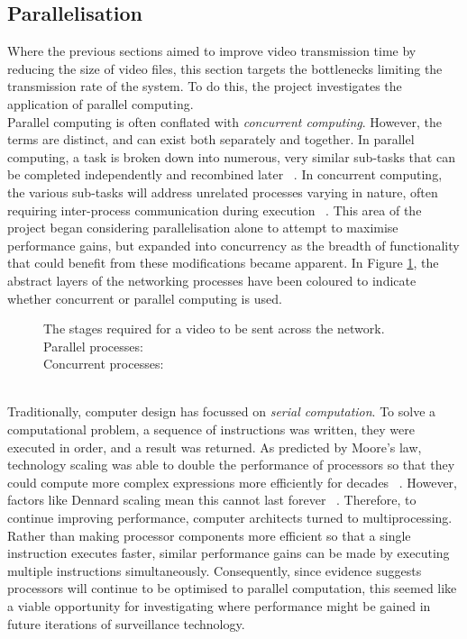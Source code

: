 \subsection{Parallelisation}
\label{sec:parallelisation}
\setlength{\leftskip}{0.5cm}
\indent \indent
Where the previous sections aimed to improve video transmission time by reducing the size of video files, this section targets the bottlenecks limiting the transmission rate of the system. To do this, the project investigates the application of parallel computing.
\smallskip \\ \indent
Parallel computing is often conflated with \textit{concurrent computing}. However, the terms are distinct, and can exist both separately and together. In parallel computing, a task is broken down into numerous, very similar sub-tasks that can be completed independently and recombined later ~\cite{ParallelismVsConcurrency}. In concurrent computing, the various sub-tasks will address unrelated processes varying in nature, often requiring inter-process communication during execution ~\cite{ParallelismVsConcurrency}. This area of the project began considering parallelisation alone to attempt to maximise performance gains, but expanded into concurrency as the breadth of functionality that could benefit from these modifications became apparent. In Figure \ref{fig:parallelStack}, the abstract layers of the networking processes have been coloured to indicate whether concurrent or parallel computing is used.
\begin{figure}[htp]
    \centering
    \scalebox{0.6}{}
    \captionsetup{justification=centering}
    \caption[Abstract view of parallel processes]{The stages required for a video to be sent across the network.\medskip\\Parallel processes: \hl{\quad\quad\quad\quad}\smallskip\\Concurrent processes: \hl{\quad\quad\quad\quad}}
    \label{fig:parallelStack}
\end{figure}
\smallskip \\ \indent
Traditionally, computer design has focussed on \textit{serial computation}. To solve a computational problem, a sequence of instructions was written, they were executed in order, and a result was returned. As predicted by Moore's law, technology scaling was able to double the performance of processors so that they could compute more complex expressions more efficiently for decades ~\cite{Moore}. However, factors like Dennard scaling mean this cannot last forever ~\cite{Dennard}. Therefore, to continue improving performance, computer architects turned to multiprocessing. Rather than making processor components more efficient so that a single instruction executes faster, similar performance gains can be made by executing multiple instructions simultaneously. Consequently, since evidence suggests processors will continue to be optimised to parallel computation, this seemed like a viable opportunity for investigating where performance might be gained in future iterations of surveillance technology.

